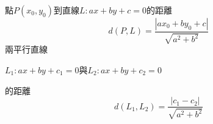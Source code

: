 點$P(x_0, y_0)$到直線$L:ax+by+c=0$的距離 
\[
    d(P, L)=\frac{|ax_0+by_0+c|}{\sqrt{a^2+b^2}}
\]
兩平行直線 \par
$L_1:ax+by+c_1=0$與$L_2:ax+by+c_2=0$ \par
的距離
\[
    d(L_1, L_2) = \frac{|c_1-c_2|}{\sqrt{a^2+b^2}}
\]